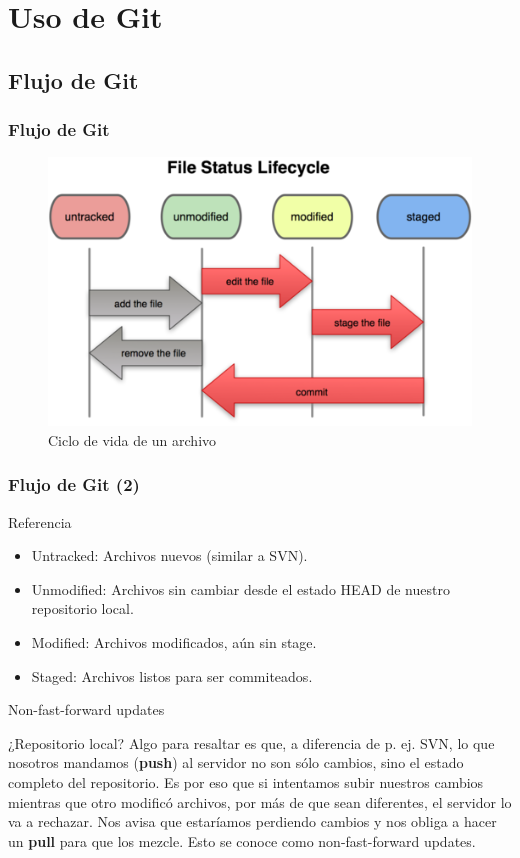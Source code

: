 \documentclass{beamer}
\begin{document}
\section{Uso de Git}

\subsection{Flujo de Git}

\begin{frame}\frametitle{Flujo de Git}
  \begin{figure}
    \includegraphics[scale=1]{flujo-git.png} 
    \caption{Ciclo de vida de un archivo}
  \end{figure}
\end{frame}

\begin{frame}\frametitle{Flujo de Git (2)}
  
  \begin{block}{Referencia}
    \begin{itemize}
    \item \alert{Untracked:} Archivos nuevos (similar a SVN). \pause
    \item \alert{Unmodified:} Archivos sin cambiar desde el estado HEAD de nuestro repositorio local. \pause
    \item \alert{Modified:} Archivos modificados, aún sin stage. \pause
    \item \alert{Staged:} Archivos listos para ser commiteados.
    \end{itemize}
  \end{block}
  
\end{frame}

\begin{frame}{Non-fast-forward updates}
  \begin{block}{¿Repositorio local? }
    Algo para resaltar es que, a diferencia de p. ej. SVN, lo que nosotros mandamos (\textbf{push}) al servidor no son sólo cambios, sino
    el estado completo del repositorio. Es por eso que si intentamos subir nuestros cambios mientras que otro modificó archivos,
    por más de que sean diferentes, el servidor lo va a rechazar. Nos avisa que estaríamos perdiendo cambios y nos obliga
    a hacer un \textbf{pull} para que los mezcle. Esto se conoce como non-fast-forward updates.
  \end{block}
\end{frame}
\end{document}

